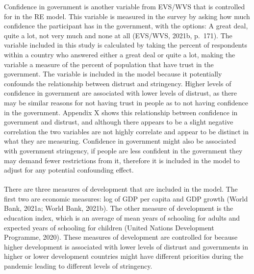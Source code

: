 \documentclass[
  11pt,
]{article}
\begin{document}
Confidence in government is another variable from EVS/WVS that is controlled for in the RE model. This variable is measured in the survey by asking how much confidence the participant has in the government, with the options: A great deal, quite a lot, not very much and none at all (EVS/WVS, 2021b, p.~171). The variable included in this study is calculated by taking the percent of respondents within a country who answered either a great deal or quite a lot, making the variable a measure of the percent of population that have trust in the government. The variable is included in the model because it potentially confounds the relationship between distrust and stringency. Higher levels of confidence in government are associated with lower levels of distrust, as there may be similar reasons for not having trust in people as to not having confidence in the government. Appendix X shows this relationship between confidence in government and distrust, and although there appears to be a slight negative correlation the two variables are not highly correlate and appear to be distinct in what they are measuring. Confidence in government might also be associated with government stringency, if people are less confident in the government they may demand fewer restrictions from it, therefore it is included in the model to adjust for any potential confounding effect.\\
~\\
There are three measures of development that are included in the model. The first two are economic measures: log of GDP per capita and GDP growth (World Bank, 2021a; World Bank, 2021b). The other measure of development is the education index, which is an average of mean years of schooling for adults and expected years of schooling for children (United Nations Development Programme, 2020). These measures of development are controlled for because higher development is associated with lower levels of distrust and governments in higher or lower development countries might have different priorities during the pandemic leading to different levels of stringency.\\
~\\
\end{document}
